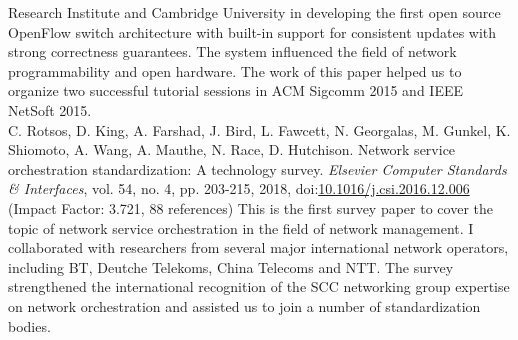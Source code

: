 \documentclass[10pt, a4paper]{article}
\newcommand{\DOI}[1]{doi:\href{https://doi.org/#1}{#1}}
\begin{document}
\begin{EntriesList}
Research Institute and Cambridge University in developing the first open source
OpenFlow switch architecture with built-in support for consistent updates with
strong correctness guarantees. The system influenced the field of network
programmability and open hardware. The work of this paper helped us to organize
two successful tutorial sessions in ACM Sigcomm 2015 and IEEE NetSoft 2015.
     \\
    C. Rotsos, D. King, A. Farshad, J. Bird, L. Fawcett, N. Georgalas, M. Gunkel, K. Shiomoto, A. Wang, A. Mauthe, N. Race, D. Hutchison.
    Network service orchestration standardization: A technology survey.
    \emph{Elsevier Computer Standards \& Interfaces}, vol. 54, no. 4,
pp. 203-215, 2018, \DOI{10.1016/j.csi.2016.12.006} (Impact Factor: 3.721, 88
references) \newline
This is the first survey paper to cover the topic of network service
orchestration in the field of network management. I collaborated with researchers
from several major international network operators, including BT,
Deutche Telekoms, China Telecoms and NTT. The survey strengthened the
international recognition of the SCC networking group expertise on network
orchestration and assisted us to join a number of standardization bodies. 
\end{EntriesList}
\end{document}
